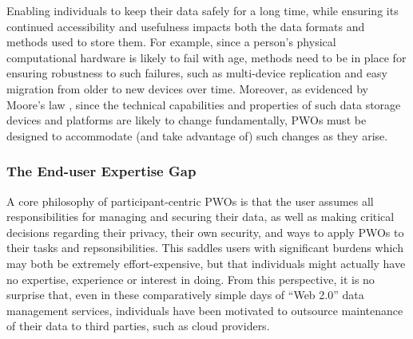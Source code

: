 \documentclass{acm_proc_article-sp}
\begin{document}
Enabling individuals to keep their data safely for a long time, while ensuring its continued accessibility and usefulness impacts both the data formats and methods used to store them.  For example, since a person's physical computational hardware is likely to fail with age, methods need to be in place for ensuring robustness to such failures, such as multi-device replication and easy migration from older to new devices over time.   Moreover, as evidenced by Moore's law \cite{schaller1997moore}, since the technical capabilities and properties of such data storage devices and platforms are likely to change fundamentally, PWOs must be designed to accommodate (and take advantage of) such changes as they arise. 

\subsubsection{The End-user Expertise Gap}

A core philosophy of participant-centric PWOs is that the user assumes all responsibilities for managing and securing their data, as well as making critical decisions regarding their privacy, their own security, and ways to apply PWOs to their tasks and repsonsibilities.  This saddles users with significant burdens which may both be extremely effort-expensive, but that individuals might actually have no expertise, experience or interest in doing.  From this perspective, it is no surprise that, even in these comparatively simple days of ``Web 2.0'' data management services, individuals have been motivated to outsource maintenance of their data to third parties, such as cloud providers. 


\end{document}
